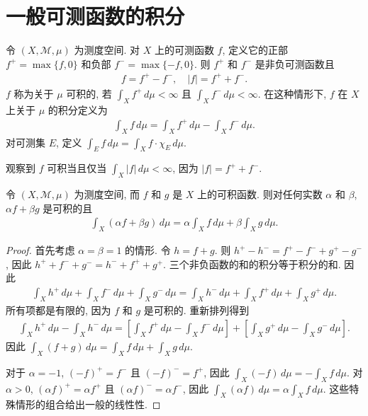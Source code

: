 \documentclass[../../main.tex]{subfiles}
\begin{document}
\section{一般可测函数的积分}\label{section:ch18-general-integral}

令 $(X,\mathcal{M},\mu)$ 为测度空间. 对 $X$ 上的可测函数 $f$, 定义它的正部 $f^{+}=\max\{f,0\}$ 和负部 $f^{-}=\max\{-f,0\}$. 则 $f^{+}$ 和 $f^{-}$ 是非负可测函数且
\begin{align*}
f=f^{+}-f^{-},\quad|f|=f^{+}+f^{-}.
\end{align*}
$f$ 称为关于 $\mu$ 可积的, 若 $\int_{X}f^{+}\,d\mu<\infty$ 且 $\int_{X}f^{-}\,d\mu<\infty$. 在这种情形下, $f$ 在 $X$ 上关于 $\mu$ 的积分定义为
\begin{align}
\int_{X}f\,d\mu=\int_{X}f^{+}\,d\mu-\int_{X}f^{-}\,d\mu.\label{align:ch18-integral-def}
\end{align}
对可测集 $E$, 定义 $\int_{E}f\,d\mu=\int_{X}f\cdot\chi_{E}\,d\mu$.

观察到 $f$ 可积当且仅当 $\int_{X}|f|\,d\mu<\infty$, 因为 $|f|=f^{+}+f^{-}$.

\begin{theorem}[积分的线性性]\label{theorem:ch18-linearity}
令 $(X,\mathcal{M},\mu)$ 为测度空间, 而 $f$ 和 $g$ 是 $X$ 上的可积函数. 则对任何实数 $\alpha$ 和 $\beta$, $\alpha f+\beta g$ 是可积的且
\begin{align*}
\int_{X}(\alpha f+\beta g)\,d\mu=\alpha\int_{X}f\,d\mu+\beta\int_{X}g\,d\mu.
\end{align*}
\end{theorem}

\begin{proof}
首先考虑 $\alpha=\beta=1$ 的情形. 令 $h=f+g$. 则 $h^{+}-h^{-}=f^{+}-f^{-}+g^{+}-g^{-}$, 因此 $h^{+}+f^{-}+g^{-}=h^{-}+f^{+}+g^{+}$. 三个非负函数的和的积分等于积分的和. 因此
\begin{align*}
\int_{X}h^{+}\,d\mu+\int_{X}f^{-}\,d\mu+\int_{X}g^{-}\,d\mu=\int_{X}h^{-}\,d\mu+\int_{X}f^{+}\,d\mu+\int_{X}g^{+}\,d\mu.
\end{align*}
所有项都是有限的, 因为 $f$ 和 $g$ 是可积的. 重新排列得到
\begin{align*}
\int_{X}h^{+}\,d\mu-\int_{X}h^{-}\,d\mu=\left[\int_{X}f^{+}\,d\mu-\int_{X}f^{-}\,d\mu\right]+\left[\int_{X}g^{+}\,d\mu-\int_{X}g^{-}\,d\mu\right].
\end{align*}
因此 $\int_{X}(f+g)\,d\mu=\int_{X}f\,d\mu+\int_{X}g\,d\mu$.

对于 $\alpha=-1$, $(-f)^{+}=f^{-}$ 且 $(-f)^{-}=f^{+}$, 因此 $\int_{X}(-f)\,d\mu=-\int_{X}f\,d\mu$. 对 $\alpha>0$, $(\alpha f)^{+}=\alpha f^{+}$ 且 $(\alpha f)^{-}=\alpha f^{-}$, 因此 $\int_{X}(\alpha f)\,d\mu=\alpha\int_{X}f\,d\mu$. 这些特殊情形的组合给出一般的线性性.
\end{proof}
\end{document}
